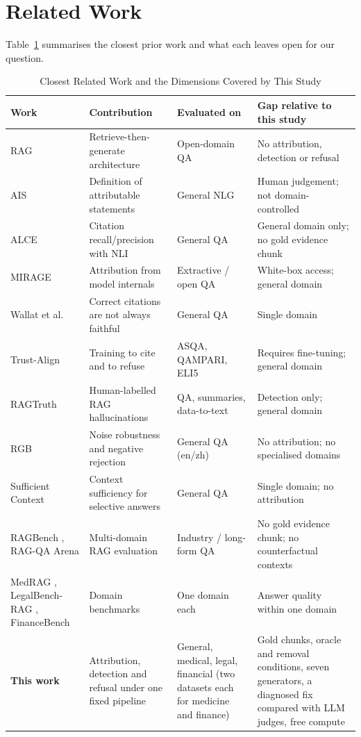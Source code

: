 \documentclass[conference]{IEEEtran}
\begin{document}
\section{Related Work}
\label{sec:related}
Table~\ref{tab:related} summarises the closest prior work and what each leaves open for our question.

\begin{table}[!t]
\caption{Closest Related Work and the Dimensions Covered by This Study}
\label{tab:related}
\centering
\footnotesize
\begin{tabular}{@{}p{3.4cm}p{3.9cm}p{3.1cm}p{6.0cm}@{}}
\toprule
Work & Contribution & Evaluated on & Gap relative to this study \\
\midrule
RAG \cite{lewis2020rag} & Retrieve-then-generate architecture & Open-domain QA & No attribution, detection or refusal \\
AIS \cite{rashkin2023ais} & Definition of attributable statements & General NLG & Human judgement; not domain-controlled \\
ALCE \cite{gao2023alce} & Citation recall/precision with NLI & General QA & General domain only; no gold evidence chunk \\
MIRAGE \cite{qi2024mirage} & Attribution from model internals & Extractive / open QA & White-box access; general domain \\
Wallat et al.\ \cite{wallat2025correctness} & Correct citations are not always faithful & General QA & Single domain \\
Trust-Align \cite{song2025trust} & Training to cite and to refuse & ASQA, QAMPARI, ELI5 & Requires fine-tuning; general domain \\
RAGTruth \cite{niu2024ragtruth} & Human-labelled RAG hallucinations & QA, summaries, data-to-text & Detection only; general domain \\
RGB \cite{chen2024rgb} & Noise robustness and negative rejection & General QA (en/zh) & No attribution; no specialised domains \\
Sufficient Context \cite{joren2025sufficient} & Context sufficiency for selective answers & General QA & Single domain; no attribution \\
RAGBench \cite{friel2024ragbench}, RAG-QA Arena \cite{han2024ragqa} & Multi-domain RAG evaluation & Industry / long-form QA & No gold evidence chunk; no counterfactual contexts \\
MedRAG \cite{xiong2024medrag}, LegalBench-RAG \cite{pipitone2024legalbenchrag}, FinanceBench \cite{islam2023financebench} & Domain benchmarks & One domain each & Answer quality within one domain \\
\midrule
\textbf{This work} & Attribution, detection and refusal under one fixed pipeline & General, medical, legal, financial (two datasets each for medicine and finance) & Gold chunks, oracle and removal conditions, seven generators, a diagnosed fix compared with LLM judges, free compute \\
\bottomrule
\end{tabular}
\end{table}
\end{document}
